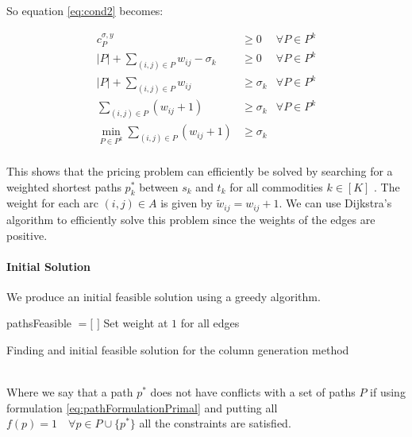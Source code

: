 \documentclass[14pt,a4paper]{article}
\theoremstyle{definition}
\numberwithin{equation}{subsection}
\begin{document}
So equation \eqref{eq:cond2} becomes:

\begin{eqnarray*}
		c_P^{\sigma,y} & \geq 0 &\forall P \in P^k\\
		|P| + \sum\limits_{(i,j) \in P}  w_{ij} -\sigma_k & \geq 0 &\forall P \in P^k\\
		|P| + \sum\limits_{(i,j) \in P}  w_{ij}  & \geq \sigma_k &\forall P \in P^k\\
		\sum\limits_{(i,j) \in P} \left( w_{ij} + 1\right)  & \geq \sigma_k &\forall P \in P^k\\
		\min_{P\in P^k}\sum\limits_{(i,j) \in P} \left( w_{ij} + 1\right)  & \geq \sigma_k & \\
\end{eqnarray*}


This shows that the pricing problem can efficiently be solved by searching for a weighted shortest paths $p^*_k$ between $s_k$ and $t_k$ for all commodities $k \in [K]$ . The weight for each arc $(i,j)\in A$ is given by $\tilde{w}_{ij} = w_{ij}+1$. We can use Dijkstra's algorithm to efficiently solve this problem since the weights of the edges are positive.





\paragraph{Initial Solution}
We produce an initial feasible solution using a greedy algorithm.\\


\begin{algorithm}[H]
	\SetAlgoLined
	pathsFeasible $= [$  $]$\;
	Set weight at $1$ for all edges\;
	
	
	\caption{Finding and initial feasible solution for the column generation method}
\end{algorithm}

$ $\\

Where we say that a path $p^*$ does not have conflicts with a set of paths $P$ if using formulation \eqref{eq:pathFormulationPrimal} and putting all $f(p) = 1 \quad \forall p\in P \cup \{p^*\}$ all the constraints are satisfied.
\end{document}

